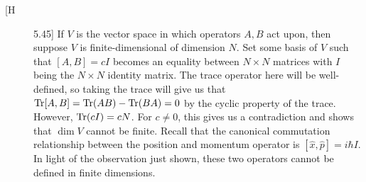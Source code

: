 \documentclass[12pt]{article}%
\begin{document}
\begin{description}
  \item [[H] 5.45]
  If $V$ is the vector space in which operators $A,B$ act upon, then suppose $V$ is finite-dimensional of dimension $N$. Set some basis of $V$ such that $[A,B] = cI$ becomes an equality between $N \times N$ matrices with $I$ being the $N \times N$ identity matrix. The trace operator here will be well-defined, so taking the trace will give us that $\Tr[A,B] = \Tr(AB) - \Tr(BA) = 0$ by the cyclic property of the trace. However, $\Tr(cI) = cN$. For $c \neq 0$, this gives us a contradiction and shows that $\dim V$ cannot be finite. Recall that the canonical commutation relationship between the position and momentum operator is $[\hat{x}, \hat{p}] = i\hbar I$. In light of the observation just shown, these two operators cannot be defined in finite dimensions.
\end{description}
\end{document}
